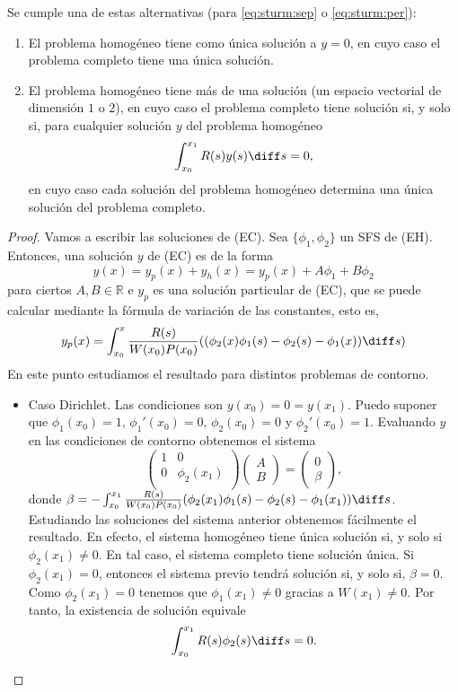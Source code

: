 \documentclass{article}
\begin{document}
\begin{thm}
  Se cumple una de estas alternativas (para \eqref{eq:sturm:sep} o \eqref{eq:sturm:per}):
  \begin{enumerate}
  \item El problema homogéneo tiene como única solución a $y = 0$, en cuyo caso el problema completo
    tiene una única solución.
  \item El problema homogéneo tiene más de una solución (un espacio vectorial de dimensión $1$ o
    $2$), en cuyo caso el problema completo tiene solución si, y solo si, para cualquier solución
    $y$ del problema homogéneo
    \[\int_{x_0}^{x_1}R(s) y(s) \diff s = 0,\]
    en cuyo caso cada solución del problema homogéneo determina una única solución del problema
    completo.
  \end{enumerate}
\end{thm}
\begin{proof}
  Vamos a escribir las soluciones de (EC). Sea $\{\phi_1, \phi_2\}$ un SFS de (EH). Entonces, una
  solución $y$ de (EC) es de la forma
  \[y(x) = y_p(x) + y_h(x) = y_p(x) + A \phi_1 + B\phi_2\] para ciertos $A, B \in \mathbb{R}$ e
  $y_p$ es una solución particular de (EC), que se puede calcular mediante la fórmula de variación
  de las constantes, esto es,
  \[y_p(x) = \int_{x_0}^x \frac{R(s)}{W(x_0) P(x_0)} ((\phi_2(x) \phi_1(s) - \phi_2(s) - \phi_1(x))
    \diff s)\] En este punto estudiamos el resultado para distintos problemas de contorno.
  \begin{itemize}
  \item Caso Dirichlet. Las condiciones son $y(x_0) = 0 = y(x_1)$. Puedo suponer que
    $\phi_1(x_0) = 1$, $\phi_1'(x_0) = 0$, $\phi_2(x_0) = 0$ y $\phi_2'(x_0) = 1$. Evaluando $y$ en
    las condiciones de contorno obtenemos el sistema
    \[\left(
        \begin{array}{cc}
          1 & 0 \\ 0 & \phi_2(x_1) \\
        \end{array}
      \right) \left(
        \begin{array}{c}
          A \\ B
        \end{array}
      \right) = \left(
        \begin{array}{c}
          0 \\ \beta
        \end{array}
      \right),
    \]
    donde
    $\beta = -\int_{x_0}^{x_1}\frac{R(s)}{W(x_0) P(x_0)}(\phi_2(x_1) \phi_1(s) - \phi_2(s) -
    \phi_1(x_1)) \diff s$. Estudiando las soluciones del sistema anterior obtenemos fácilmente el
    resultado. En efecto, el sistema homogéneo tiene única solución si, y solo si
    $\phi_2(x_1) \ne 0$. En tal caso, el sistema completo tiene solución única. Si
    $\phi_2(x_1) = 0$, entonces el sistema previo tendrá solución si, y solo si, $\beta = 0$.  Como
    $\phi_2(x_1) = 0$ tenemos que $\phi_1(x_1) \ne 0$ gracias a $W(x_1) \ne 0$. Por tanto, la
    existencia de solución equivale
    \[\int_{x_0}^{x_1} R(s) \phi_2(s) \diff s = 0.\]
  \end{itemize}
\end{proof}
\end{document}
